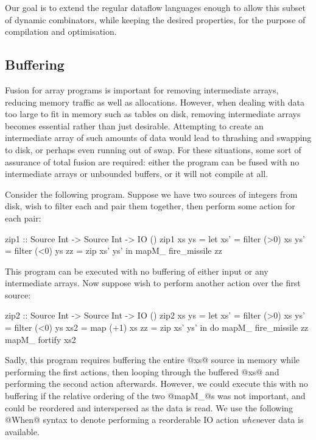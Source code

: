 Our goal is to extend the regular dataflow languages enough to allow this subset of dynamic combinators, while keeping the desired properties, for the purpose of compilation and optimisation.

\subsection{Buffering}

Fusion for array programs is important for removing intermediate arrays, reducing memory traffic as well as allocations.
However, when dealing with data too large to fit in memory such as tables on disk, removing intermediate arrays becomes essential rather than just desirable.
Attempting to create an intermediate array of such amounts of data would lead to thrashing and swapping to disk, or perhaps even running out of swap.
For these situations, some sort of assurance of total fusion are required: either the program can be fused with no intermediate arrays or unbounded buffers, or it will not compile at all.

Consider the following program.
Suppose we have two sources of integers from disk, wish to filter each and pair them together, then perform some action for each pair:

\begin{code}
zip1 :: Source Int -> Source Int -> IO ()
zip1 xs ys
 = let xs'  = filter (>0) xs
       ys'  = filter (<0) ys
       zz   = zip xs' ys'
   in  mapM_ fire_missile zz
\end{code}

This program can be executed with no buffering of either input or any intermediate arrays.
Now suppose wish to perform another action over the first source:

\begin{code}
zip2 :: Source Int -> Source Int -> IO ()
zip2 xs ys
 = let xs'  = filter (>0) xs
       ys'  = filter (<0) ys
       xs2  = map    (+1) xs
       zz   = zip xs' ys'
   in  do   mapM_ fire_missile zz
            mapM_ fortify      xs2
\end{code}

Sadly, this program requires buffering the entire @xs@ source in memory while performing the first actions, then looping through the buffered @xs@ and performing the second action afterwards.
However, we could execute this with no buffering if the relative ordering of the two @mapM_@s was not important, and could be reordered and interspersed as the data is read.
We use the following @When@ syntax to denote performing a reorderable IO action \emph{when}ever data is available.


